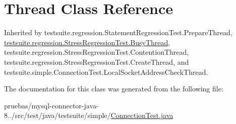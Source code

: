 \hypertarget{class_thread}{}\section{Thread Class Reference}
\label{class_thread}


Inherited by testsuite.\+regression.\+Statement\+Regression\+Test.\+Prepare\+Thread, \mbox{\hyperlink{classtestsuite_1_1regression_1_1_stress_regression_test_1_1_busy_thread}{testsuite.\+regression.\+Stress\+Regression\+Test.\+Busy\+Thread}}, testsuite.\+regression.\+Stress\+Regression\+Test.\+Contention\+Thread, testsuite.\+regression.\+Stress\+Regression\+Test.\+Create\+Thread, and testsuite.\+simple.\+Connection\+Test.\+Local\+Socket\+Address\+Check\+Thread.



The documentation for this class was generated from the following file\+:\begin{DoxyCompactItemize}
\item 
pruebas/mysql-\/connector-\/java-\/8../src/test/java/testsuite/simple/\mbox{\hyperlink{_connection_test_8java}{Connection\+Test.\+java}}\end{DoxyCompactItemize}
